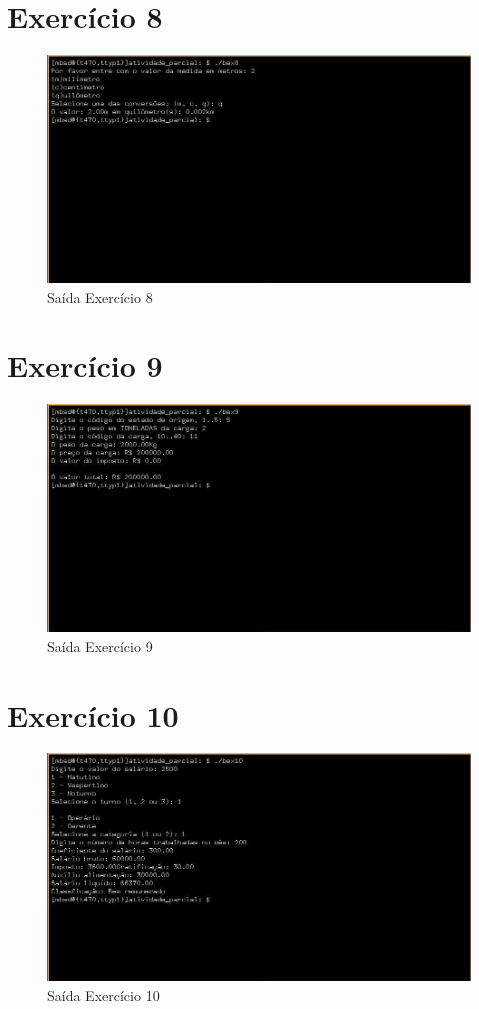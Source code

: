 \documentclass[12pt,a4paper]{article}
\let\oldsection\section
\renewcommand\section{\clearpage\oldsection}
\begin{document}
\section{Exercício 8}

\begin{figure}[htb!]
	\centering
	\includegraphics[width=16cm]{ex8}
	\caption{Saída Exercício 8}
	\label{fig:8}
\end{figure}

\section{Exercício 9}

\begin{figure}[htb!]
	\centering
	\includegraphics[width=16cm]{ex9}
	\caption{Saída Exercício 9}
	\label{fig:9}
\end{figure}

\section{Exercício 10}

\begin{figure}[htb!]
	\centering
	\includegraphics[width=16cm]{ex10}
	\caption{Saída Exercício 10}
	\label{fig:10}
\end{figure}
\end{document}
